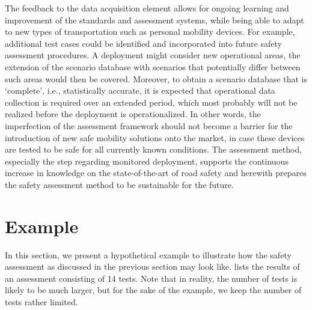 \documentclass[twoside,twocolumn,9pt]{article}
\theoremstyle{plain}
\theoremstyle{remark}\newtheorem{remarkenv}{Remark}        %
\begin{document}
The feedback to the data acquisition element allows for ongoing learning and improvement of the standards and assessment systems, while being able to adapt to new types of transportation such as personal mobility devices. For example, additional test cases could be identified and incorporated into future safety assessment procedures. A deployment might consider new operational areas, the extension of the scenario database with scenarios that potentially differ between such areas would then be covered. Moreover, to obtain a scenario database that is `complete', i.e., statistically accurate, it is expected that operational data collection is required over an extended period, which most probably will not be realized before the deployment is operationalized. In other words, the imperfection of the assessment framework should not become a barrier for the introduction of new safe mobility solutions onto the market, in case these devices are tested to be safe for all currently known conditions. The assessment method, especially the step regarding monitored deployment, supports the continuous increase in knowledge on the state-of-the-art of road safety and herewith prepares the safety assessment method to be sustainable for the future.


\section{Example}
\label{sec:example}

In this section, we present a hypothetical example to illustrate how the safety assessment as discussed in the previous section may look like.  lists the results of an assessment consisting of 14 tests. Note that in reality, the number of tests is likely to be much larger, but for the sake of the example, we keep the number of tests rather limited. 
\end{document}
